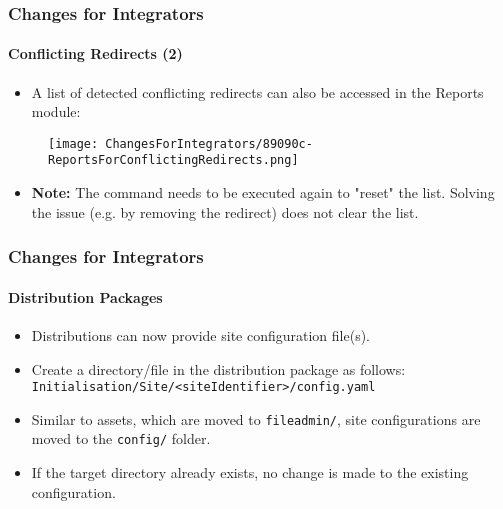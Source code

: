 
\begin{frame}[fragile]
	\frametitle{Changes for Integrators}
	\framesubtitle{Conflicting Redirects (2)}

	\begin{itemize}
		\item A list of detected conflicting redirects can also be accessed in the Reports module:
	\end{itemize}

	\begin{figure}
		\texttt{[image: ChangesForIntegrators/89090c-ReportsForConflictingRedirects.png]}
	\end{figure}

	\begin{itemize}
		\item
			\small\textbf{Note:}
				The command needs to be executed again to "reset" the list.
				Solving the issue (e.g. by removing the redirect) does not clear the list.
			\normalsize
	\end{itemize}

\end{frame}


\begin{frame}[fragile]
	\frametitle{Changes for Integrators}
	\framesubtitle{Distribution Packages}

	\lstset{basicstyle=\tiny\ttfamily}

	\begin{itemize}
		\item Distributions can now provide site configuration file(s).

		\item Create a directory/file in the distribution package as follows:\newline
			\texttt{Initialisation/Site/<siteIdentifier>/config.yaml}

		\item Similar to assets, which are moved to \texttt{fileadmin/},\newline
			site configurations are moved to the \texttt{config/} folder.

		\item If the target directory already exists, no change is made to the existing configuration.
	\end{itemize}

\end{frame}

